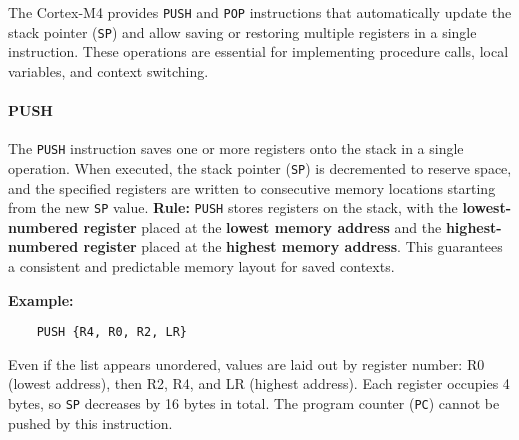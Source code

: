 The Cortex-M4 provides \texttt{PUSH} and \texttt{POP} instructions that automatically update the stack pointer (\texttt{SP}) and allow saving or restoring multiple registers in a single instruction.  
These operations are essential for implementing procedure calls, local variables, and context switching.
\paragraph{PUSH}

The \texttt{PUSH} instruction saves one or more registers onto the stack in a single operation.
When executed, the stack pointer (\texttt{SP}) is decremented to reserve space, and the specified registers are written to consecutive memory locations starting from the new \texttt{SP} value.
\textbf{Rule:} \texttt{PUSH} stores registers on the stack, with the \textbf{lowest-numbered register} placed at the \textbf{lowest memory address} and the \textbf{highest-numbered register} placed at the \textbf{highest memory address}.
This guarantees a consistent and predictable memory layout for saved contexts.

\medskip
\noindent
\textbf{Example:}
\begin{lstlisting}
    PUSH {R4, R0, R2, LR}
\end{lstlisting}

Even if the list appears unordered, values are laid out by register number: R0 (lowest address), then R2, R4, and LR (highest address).
Each register occupies 4 bytes, so \texttt{SP} decreases by 16 bytes in total.
The program counter (\texttt{PC}) cannot be pushed by this instruction.

